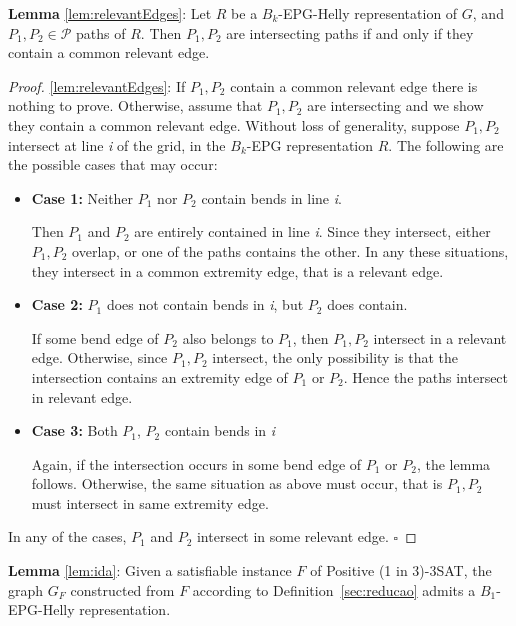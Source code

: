\documentclass[runningheads]{llncs}
\begin{document}
\begin{lemma*}
\textbf{Lemma} \ref{lem:relevantEdges}:
Let $R$ be a $B_k$-EPG-Helly representation of $G$, and $P_1, P_2 \in \mathcal{P}$ paths of $R$. Then $P_1, P_2$ are intersecting paths if and only if they contain a common relevant edge.
\end{lemma*}


\begin{proof}
\ref{lem:relevantEdges}: If $P_1, P_2$ contain a common relevant edge there is nothing to prove. Otherwise, assume that $P_1, P_2$ are intersecting and we show they contain a common relevant edge. Without loss of generality, suppose $P_1, P_2$ intersect at line \textit{i} of the grid, in the  $B_k$-EPG representation $R$. The following are the possible cases that may occur:

\begin{itemize}
\item \textbf{Case 1:} Neither $P_1$ nor $P_2$ contain bends in line \textit{i}. 

Then $P_1$ and $ P_2$  are entirely contained in line \textit{i}. Since they intersect, either $P_1, P_2$  overlap, or one of the paths contains the other. In any these situations, they intersect in a common extremity edge, that is a relevant edge.

\item \textbf{Case 2:} $P_1$ does not contain bends in \textit{i}, but $ P_2$ does contain.

If some bend edge of $P_2$ also belongs to $P_1$, then $P_1, P_2$  intersect in  a relevant edge. Otherwise, since $P_1, P_2$  intersect, the only possibility is that the intersection contains an extremity edge of $P_1$ or $ P_2$. Hence the paths intersect in relevant edge.  

\item \textbf{Case 3:} Both $P_1$,  $P_2$ contain bends in \textit{i}

Again, if the intersection occurs in some bend edge of $P_1$  or $P_2$, the lemma follows. Otherwise, the same situation as above must occur, that is $P_1, P_2$  must intersect in same extremity edge.
 
\end{itemize}
In any of the cases, $P_1$ and $P_2$ intersect in some relevant edge.
$\square$ \end{proof}


\begin{lemma*}\textbf{Lemma} \ref{lem:ida}:
Given a satisfiable instance $F$ of {\sc Positive (1 in 3)-3SAT}, the graph $G_F$ constructed from $F$ according to Definition~\ref{sec:reducao} admits a $B_{1}$-EPG-Helly representation.
\end{lemma*}
\end{document}
